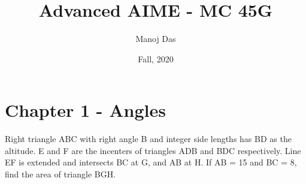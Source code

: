 \documentclass[11pt,twoside]{scrartcl}
\begin{document}
\title{Advanced AIME - MC 45G}

\author{Manoj Das}
\date{Fall, 2020}

\maketitle

\section{Chapter 1 - Angles}
\begin{example}\label{bmt-12-r5-p4}
    Right triangle ABC with right angle B and
    integer side lengths has BD as the altitude. E and F are the incenters of triangles
    ADB and BDC respectively. Line EF is extended and intersects BC at G, and AB
    at H. If AB = 15 and BC = 8, find the area of triangle BGH.    
\end{example}
\end{document}
